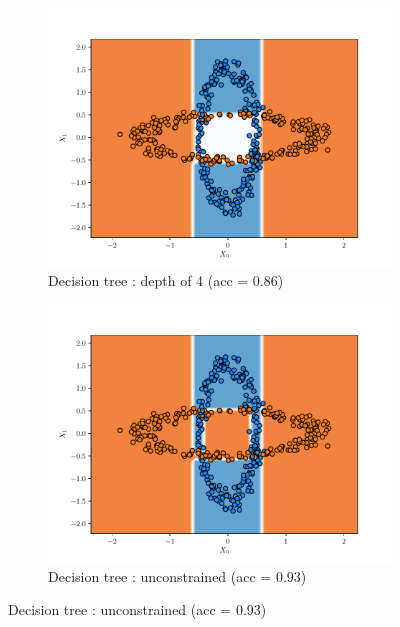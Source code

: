\begin{figure}[H]
\begin{subfigure}{0.495\textwidth}
        \includegraphics[width=\textwidth]{resources/pdf/make_data1_dt_4.pdf}
        \caption{Decision tree : depth of 4 (acc = \num{0.86})}
    \end{subfigure}
    \begin{subfigure}{0.495\textwidth}
        \includegraphics[width=\textwidth]{resources/pdf/make_data1_dt_None.pdf}
        \caption{Decision tree : unconstrained (acc = \num{0.93})}
    \end{subfigure}
    \label{fig:dt_make_data1}
\end{figure}
